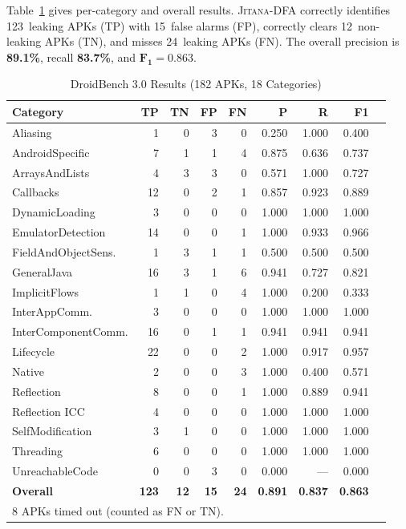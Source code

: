\documentclass[conference]{IEEEtran}
\begin{document}
Table~\ref{tab:results} gives per-category and overall results.
\textsc{Jitana-DFA} correctly identifies 123~leaking APKs (TP) with 15~false
alarms (FP), correctly clears 12~non-leaking APKs (TN), and misses 24~leaking
APKs (FN). The overall precision is \textbf{89.1\%}, recall \textbf{83.7\%},
and $\mathbf{F_1 = 0.863}$.

\begin{table}[t]
\caption{DroidBench 3.0 Results (182 APKs, 18 Categories)}
\label{tab:results}
\centering
\begin{tabular}{lrrrrrrrr}
\toprule
Category & TP & TN & FP & FN & P & R & F1 \\
\midrule
Aliasing               &  1 &  0 &  3 &  0 & 0.250 & 1.000 & 0.400 \\
AndroidSpecific        &  7 &  1 &  1 &  4 & 0.875 & 0.636 & 0.737 \\
ArraysAndLists         &  4 &  3 &  3 &  0 & 0.571 & 1.000 & 0.727 \\
Callbacks              & 12 &  0 &  2 &  1 & 0.857 & 0.923 & 0.889 \\
DynamicLoading         &  3 &  0 &  0 &  0 & 1.000 & 1.000 & 1.000 \\
EmulatorDetection      & 14 &  0 &  0 &  1 & 1.000 & 0.933 & 0.966 \\
FieldAndObjectSens.    &  1 &  3 &  1 &  1 & 0.500 & 0.500 & 0.500 \\
GeneralJava            & 16 &  3 &  1 &  6 & 0.941 & 0.727 & 0.821 \\
ImplicitFlows          &  1 &  1 &  0 &  4 & 1.000 & 0.200 & 0.333 \\
InterAppComm.          &  3 &  0 &  0 &  0 & 1.000 & 1.000 & 1.000 \\
InterComponentComm.    & 16 &  0 &  1 &  1 & 0.941 & 0.941 & 0.941 \\
Lifecycle              & 22 &  0 &  0 &  2 & 1.000 & 0.917 & 0.957 \\
Native                 &  2 &  0 &  0 &  3 & 1.000 & 0.400 & 0.571 \\
Reflection             &  8 &  0 &  0 &  1 & 1.000 & 0.889 & 0.941 \\
Reflection ICC         &  4 &  0 &  0 &  0 & 1.000 & 1.000 & 1.000 \\
SelfModification       &  3 &  1 &  0 &  0 & 1.000 & 1.000 & 1.000 \\
Threading              &  6 &  0 &  0 &  0 & 1.000 & 1.000 & 1.000 \\
UnreachableCode        &  0 &  0 &  3 &  0 & 0.000 &  ---  & 0.000 \\
\midrule
\textbf{Overall}       & \textbf{123} & \textbf{12} & \textbf{15} & \textbf{24}
  & \textbf{0.891} & \textbf{0.837} & \textbf{0.863} \\
\bottomrule
\multicolumn{8}{l}{\footnotesize 8 APKs timed out (counted as FN or TN).}
\end{tabular}
\end{table}
\end{document}
